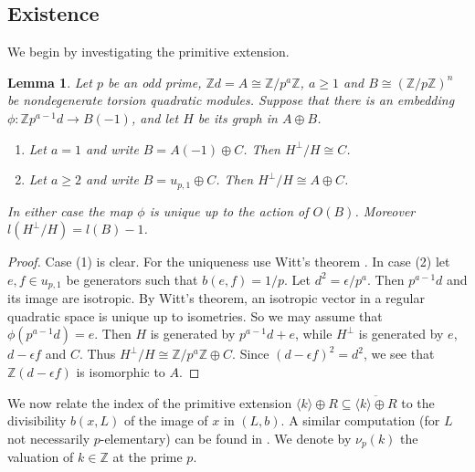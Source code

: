 \documentclass{amsart}
\theoremstyle{definition}
\theoremstyle{plain}
\newtheorem{lemma}[definition]{Lemma}
\newcommand{\ZZ}{\mathbb{Z}}
\begin{document}
\subsection{Existence}
We begin by investigating the primitive extension.
\begin{lemma}\label{lem:glue-unique}
 Let $p$ be an odd prime, $\ZZ d = A\cong \ZZ/p^a\ZZ$, $a\geq 1$ and
 $B \cong (\ZZ/p\ZZ)^n$ be nondegenerate torsion quadratic
 modules.
 Suppose that there is an embedding $\phi \colon \ZZ p^{a-1}d \rightarrow B(-1)$,
 and let $H$ be its graph in $A \oplus B$.
 \begin{enumerate}
  \item Let $a=1$ and write $B=A(-1)\oplus C$. Then $H^\perp/H \cong C$.
  \item Let $a\geq 2$ and write $B = u_{p,1} \oplus C$. Then $H^\perp/H \cong A \oplus C$.
 \end{enumerate}
 In either case the map $\phi$ is unique up to the action of $O(B)$.
 Moreover $l(H^\perp/H) = l(B)-1$.
 \end{lemma}
\begin{proof}
Case (1) is clear. For the uniqueness use Witt's theorem \cite[Ch.\ 1, Thm.\ 5.3]{scharlau}.
In case (2) let $e,f \in u_{p,1}$ be generators such that
$b(e,f)=1/p$. Let $d^2 = \epsilon/p^a$. Then
$p^{a-1}d$ and its image are isotropic. By Witt's theorem, an isotropic vector in a
regular quadratic space is unique up to isometries. So we may assume that $\phi(p^{a-1}d)=e$. Then $H$ is generated by $p^{a-1}d+e$, while
$H^\perp$ is generated by $e$, $d- \epsilon f$ and $C$.
Thus $H^\perp/H \cong \ZZ/p^a \ZZ \oplus C$.
Since $(d- \epsilon f)^2=d^2$, we see that
 $\ZZ(d- \epsilon f)$ is isomorphic to $A$.
\end{proof}

We now relate the index of the primitive extension $\langle k \rangle \oplus R \subseteq \overline{\langle k \rangle \oplus R}$ to the divisibility $b(x, L)$ of the image of $x$ in $(L,b)$. A similar computation (for $L$ not necessarily $p$-elementary) can be found in \cite[Prop.\ 6.1]{garbagnati_sarti}. We denote by $\nu_p(k)$ the valuation of $k \in \ZZ$ at the prime $p$.
\end{document}
